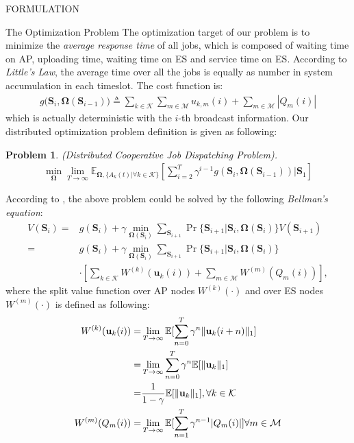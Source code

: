 \documentclass[10pt, conference, letterpaper]{IEEEtran}
\newtheorem{problem}{Problem}
\newcommand{\define}{\triangleq}
\renewcommand{\vec}{\mathbf}
\DeclarePairedDelimiter{\Inorm}{\|}{\|_1}
\newcommand{\apSet}{\mathcal{K}}
\newcommand{\esSet}{\mathcal{M}}
\newcommand{\Stat}{\mathbf{S}}
\newcommand{\Policy}{\mathbf{\Omega}}
\begin{document}
\begin{section}{FORMULATION}
        \begin{subsection}{The Optimization Problem}
            The optimization target of our problem is to minimize the \emph{average response time} of all jobs, which is composed of waiting time on AP, uploading time, waiting time on ES and service time on ES. According to \emph{Little's Law}, the average time over all the jobs is equally as number in system accumulation in each timeslot. The cost function is:
            \begin{align}
                g \bigg( \Stat_{i}, \Policy(\Stat_{i-1}) \bigg) \define \sum_{k\in\apSet}\sum_{m\in\esSet} u_{k,m}(i) + \sum_{m\in\esSet}|Q_m(i)|
            \end{align}
            which is actually deterministic with the $i$-th broadcast information.
            Our distributed optimization problem definition is given as following:
            \begin{problem}
                (Distributed Cooperative Job Dispatching Problem).
                \begin{gather}
                    \min_{\Policy} \lim_{T \to \infty}
                        \mathbb{E}_{\Policy, \{A_k(t)|\forall k\in\apSet\}}
                            [\sum_{i=2}^{T} \gamma^{i-1} g(\Stat_{i}, \Policy(\Stat_{i-1}))|\Stat_1]
                \end{gather}
            \end{problem}

            According to \cite{sutton1998introduction}, the above problem could be solved by the following \emph{Bellman's equation}:
            \begin{align}
                V(\Stat_{i}) =& g(\Stat_i) + \gamma \min_{\Policy(\Stat_{i})} \sum_{\Stat_{i+1}} \Pr\{ \Stat_{i+1}|\Stat_{i}, \Policy(\Stat_{i}) \} V(\Stat_{i+1})
                \nonumber\\
                =& g(\Stat_{i}) + \gamma \min_{\Policy(\Stat_{i})} \sum_{\Stat_{i+1}} \Pr\{ \Stat_{i+1}|\Stat_{i}, \Policy(\Stat_{i}) \}
                    \nonumber\\
                    & \cdot [\sum_{k\in\apSet} W^{(k)}(\vec{u}_k(i)) + \sum_{m\in\esSet} W^{(m)}(Q_m(i))],
            \end{align}
            where the split value function over AP nodes $W^{(k)}(\cdot)$ and over ES nodes $W^{(m)}(\cdot)$ is defined as following:
            \begin{align}
                W^{(k)}(\vec{u}_k(i)) =& \lim_{T\to\infty} \mathbb{E}[\sum_{n=0}^{T} \gamma^{n} \Inorm{\vec{u}_k(i+n)}]
                \nonumber\\
                =& \lim_{T\to\infty} \sum_{n=0}^{T} \gamma^{n} \mathbb{E}[\Inorm{\vec{u}_k}]
                \nonumber\\
                =& \frac{1}{1-\gamma} \mathbb{E}[\Inorm{\vec{u}_k}], \forall k\in\apSet
                \\
                W^{(m)}(Q_m(i)) =& \lim_{T\to\infty} \mathbb{E}[\sum_{n=1}^{T} \gamma^{n-1} |Q_m(i)|]
                \forall m\in\esSet
            \end{align}


\end{subsection}
\end{section}
\end{document}
